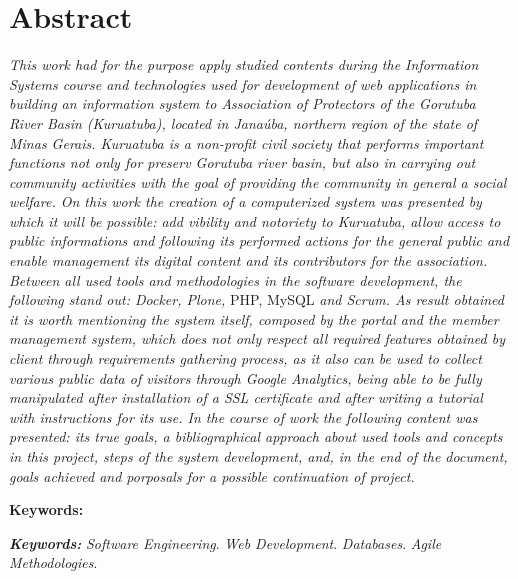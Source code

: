 \chapter*{Abstract}
\vspace{0.4cm}
\noindent \textit{This work had for  the purpose apply studied contents during the Information Systems course and technologies  used for development of web applications   in building an information system to Association of Protectors of the Gorutuba River Basin (Kuruatuba), located in Janaúba, northern region of the state of Minas Gerais. 
Kuruatuba is a 
non-profit civil society that performs important functions not only for preserv Gorutuba river basin, but also in carrying out community activities with the goal of providing the community in general a social welfare.
On this work the creation of a computerized system was presented by which it will be possible: add vibility and notoriety to Kuruatuba, allow access to public informations and following its performed actions for the general public and enable management its digital content and its contributors for the association.
Between all used tools and methodologies in the software development, the following stand out: Docker, Plone,} PHP, MySQL \textit{and Scrum.
As result obtained it is worth mentioning the system itself, composed by the portal and the member management system, which does not only respect all required features obtained by client through requirements gathering process, as it also can be used to collect various public data of visitors through Google Analytics, being able to be fully manipulated after installation of a SSL certificate and after writing a tutorial with instructions for its use.
In the course of work the following content was presented: its true goals, a bibliographical approach about used tools and concepts in this project, steps of the system development, and, in the end of the document, goals achieved and porposals for a possible continuation of project.}

\begin{labeling}{\textbf{Keywords:}}
\item[\textit{\textbf{Keywords:}}] 
\textit{Software Engineering}.
\textit{Web Development}.
\textit{Databases}.
\textit{Agile Methodologies}.
\end{labeling}
